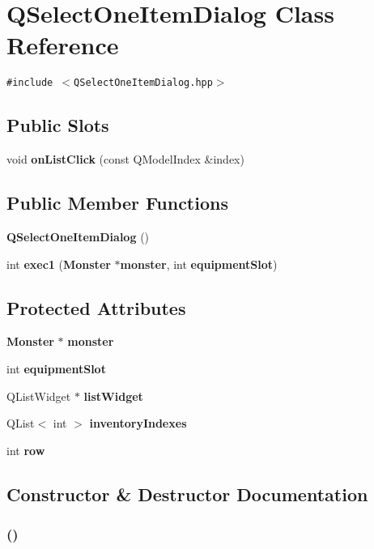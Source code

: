 \section{QSelect\-One\-Item\-Dialog Class Reference}
\label{classQSelectOneItemDialog}
{\tt \#include $<$QSelect\-One\-Item\-Dialog.hpp$>$}

\subsection*{Public Slots}
\begin{CompactItemize}
\item 
void {\bf on\-List\-Click} (const QModel\-Index \&index)
\end{CompactItemize}
\subsection*{Public Member Functions}
\begin{CompactItemize}
\item 
{\bf QSelect\-One\-Item\-Dialog} ()
\item 
int {\bf exec1} ({\bf Monster} $\ast${\bf monster}, int {\bf equipment\-Slot})
\end{CompactItemize}
\subsection*{Protected Attributes}
\begin{CompactItemize}
\item 
{\bf Monster} $\ast$ {\bf monster}
\item 
int {\bf equipment\-Slot}
\item 
QList\-Widget $\ast$ {\bf list\-Widget}
\item 
QList$<$ int $>$ {\bf inventory\-Indexes}
\item 
int {\bf row}
\end{CompactItemize}


\subsection{Constructor \& Destructor Documentation}
\subsubsection{ ()}\label{classQSelectOneItemDialog_a0}




